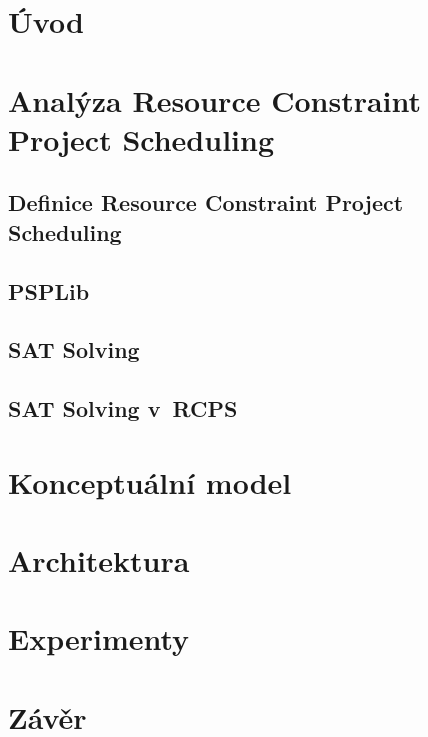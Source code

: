 \documentclass[a4paper, 12pt]{article}
\title{\rcps}
\author{Martin Hruška\\xhrusk16@stud.fit.vutbr.cz}
\date{}
\newcommand{\rcps}[0]{Resource Constraint Project Scheduling}
\begin{document}
\maketitle

\section{Úvod}
\label{sec:intro}

\section{Analýza \rcps}
\subsection{Definice \rcps}
\subsection{PSPLib}
\subsection{SAT Solving}
\subsection{SAT Solving v~RCPS}

\section{Konceptuální model}

\section{Architektura}

\section{Experimenty}

\section{Závěr}

\cite{Peringer:IMS} %
\newpage


\end{document}
